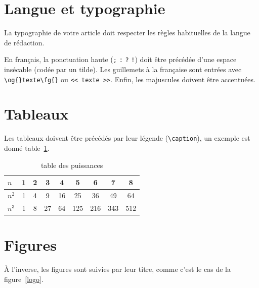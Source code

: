 \documentclass[francais]{gretsi}
\begin{document}

\section{Langue et typographie}

La typographie de votre article doit respecter les règles habituelles de la langue de rédaction.

En français, la ponctuation haute (\verb&;& \verb&:& \verb&?& \verb&!&) doit être précédée d'une espace insécable
(codée par un tilde).
Les guillemets à la française sont entrées avec
\verb!\og{}texte\fg{}! ou
\verb!<< texte >>!.
Enfin, les majuscules doivent être accentuées.


\section{Tableaux}

Les tableaux doivent être précédés par leur légende (\verb!\caption!),
un exemple est donné table~\ref{puissancededeux}.

\begin{table}[htb]
    \caption{\label{puissancededeux}table des puissances}
    \begin{center}
    \begin{tabular}{l*{8}{c}}
        \toprule
        $n$   &   1 &   2 &   3 &   4 &   5 &    6 &  7 &  8 \\
        \midrule
        $n^2$ &   1 &   4 &   9 &  16 &  25 &  36 &  49 &  64 \\
        $n^3$ &   1 &   8 &  27 &  64 & 125 & 216 & 343 & 512 \\
        \bottomrule
    \end{tabular}
    \end{center}
\end{table}


\section{Figures}

À l'inverse, les figures sont suivies par leur titre, comme c'est le cas de la figure~\ref{logo}.
\end{document}

